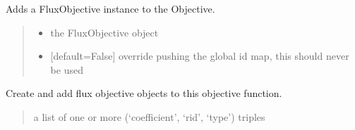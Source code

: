 \documentclass[letterpaper,12pt,english]{sphinxmanual}
\begin{document}
\begin{fulllineitems}
\begin{fulllineitems}
\label{\detokenize{api/core:cbmpy.CBModel.Objective.addFluxObjective}}
\pysigstartsignatures
\pysiglinewithargsret
{}
{\sphinxparamcomma {}}
{}
\pysigstopsignatures
\sphinxAtStartPar
Adds a FluxObjective instance to the Objective.
\begin{quote}\begin{description}
\begin{itemize}
\item {} 
\sphinxAtStartPar
{} \textendash{} the FluxObjective object

\item {} 
\sphinxAtStartPar
{} \textendash{} {[}default=False{]} override pushing the global id map, this should never be used

\end{itemize}

\end{description}\end{quote}

\end{fulllineitems}


\begin{fulllineitems}
\label{\detokenize{api/core:cbmpy.CBModel.Objective.createFluxObjectives}}
\pysigstartsignatures
\pysiglinewithargsret
{}
{}
{}
\pysigstopsignatures
\sphinxAtStartPar
Create and add flux objective objects to this objective function.
\begin{quote}\begin{description}
\sphinxAtStartPar
{} \textendash{} a list of one or more (‘coefficient’, ‘rid’, ‘type’) triples

\end{description}\end{quote}

\end{fulllineitems}


\end{fulllineitems}
\end{document}
